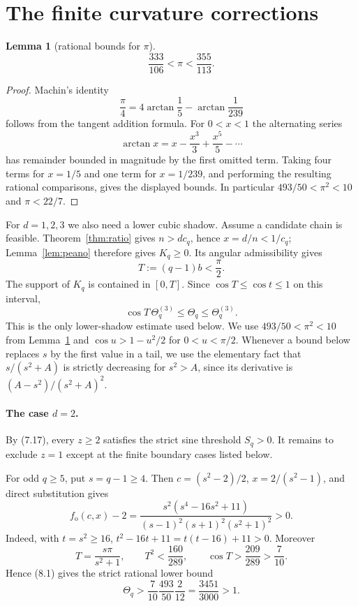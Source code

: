 \documentclass[11pt]{article}
\newtheorem{lemma}[theorem]{Lemma}
\theoremstyle{remark}
\begin{document}
\section{The finite curvature corrections}\label{sec:finite}

\begin{lemma}[rational bounds for $\pi$]\label{lem:pibounds}
\[
\frac{333}{106}<\pi<\frac{355}{113}.
\]
\end{lemma}
\begin{proof}
Machin's identity
\[
\frac\pi4=4\arctan\frac15-\arctan\frac1{239}
\]
follows from the tangent addition formula. For $0<x<1$ the alternating series
\[
\arctan x=x-\frac{x^3}{3}+\frac{x^5}{5}-\cdots
\]
has remainder bounded in magnitude by the first omitted term. Taking four terms for $x=1/5$ and one term for $x=1/239$, and performing the resulting rational comparisons, gives the displayed bounds. In particular $493/50<\pi^2<10$ and $\pi<22/7$.
\end{proof}

For \(d=1,2,3\) we also need a lower cubic shadow.  Assume a candidate
chain is feasible.  Theorem~\ref{thm:ratio} gives \(n>dc_q\), hence
\(x=d/n<1/c_q\); Lemma~\ref{lem:peano} therefore gives \(K_q\ge0\).
Its angular admissibility gives
\[
T:=(q-1)b<\frac\pi2.
\]
The support of \(K_q\) is contained in \([0,T]\).  Since
\(\cos T\le\cos t\le1\) on this interval,
\[
\boxed{
\cos T\,\Theta_q^{(3)}\le\Theta_q\le\Theta_q^{(3)}.
}
\tag{8.1}
\]
This is the only lower-shadow estimate used below.  We use
\(493/50<\pi^2<10\) from Lemma~\ref{lem:pibounds} and
\(\cos u>1-u^2/2\) for \(0<u<\pi/2\).  Whenever a bound below replaces
\(s\) by the first value in a tail, we use the elementary fact that
\(s/(s^2+A)\) is strictly decreasing for \(s^2>A\), since its derivative is
\((A-s^2)/(s^2+A)^2\).

\paragraph{The case \(d=2\).}
By (7.17), every \(z\ge2\) satisfies the strict sine threshold \(S_q>0\).  It remains to exclude \(z=1\)
except at the finite boundary cases listed below.

For odd \(q\ge5\), put \(s=q-1\ge4\).  Then
\(c=(s^2-2)/2\), \(x=2/(s^2-1)\), and direct substitution gives
\[
f_{\mathrm o}(c,x)-2
=
\frac{s^2(s^4-16s^2+11)}
{(s-1)^2(s+1)^2(s^2+1)^2}>0.
\tag{8.2}
\]
Indeed, with \(t=s^2\ge16\),
\(t^2-16t+11=t(t-16)+11>0\).  Moreover
\[
T=\frac{s\pi}{s^2+1},
\qquad
T^2<\frac{160}{289},
\qquad
\cos T>\frac{209}{289}>\frac7{10}.
\]
Hence (8.1) gives the strict rational lower bound
\[
\Theta_q>
\frac7{10}\frac{493}{50}\frac{2}{12}
=\frac{3451}{3000}>1.
\tag{8.3}
\]
\end{document}
